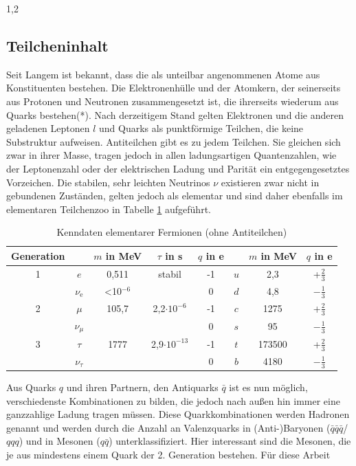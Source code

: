 \documentclass[11pt,a4paper,twoside]{report}
\begin{document}
\begin{spacing}{1,2}
\subsection{Teilcheninhalt}
Seit Langem ist bekannt, dass die als unteilbar angenommenen Atome aus Konstituenten bestehen. Die Elektronenhülle und der Atomkern, der seinerseits aus
Protonen und Neutronen zusammengesetzt ist, die ihrerseits wiederum aus Quarks bestehen(*). Nach derzeitigem Stand gelten Elektronen und die anderen geladenen 
Leptonen $l$ und Quarks als punktförmige
Teilchen, die keine Substruktur aufweisen. Antiteilchen gibt es zu jedem Teilchen. Sie gleichen sich zwar in ihrer Masse, tragen jedoch in allen ladungsartigen Quantenzahlen, wie der Leptonenzahl oder
der elektrischen Ladung und Parität ein entgegengesetztes Vorzeichen. Die stabilen, sehr leichten Neutrinos $\nu$ existieren zwar nicht in gebundenen Zuständen, gelten jedoch als elementar und sind daher 
ebenfalls im elementaren Teilchenzoo \cite{PDG} in Tabelle \ref{tab_particlezoo} aufgeführt.
\begin{table}[H]
\begin{tabular}{c|cccc|ccc} \toprule 
 Generation & & $m$ in MeV & $\tau$ in s & $q$ in e & & $m$ in MeV & $q$ in e\\
 \midrule
  1 & $e$ & 0,511 & stabil & -1 & $u$ & 2,3 & +$\frac23$\\
  &$\nu_\text{e}$& <10$^{-6}$ &  & 0 & $d$ & 4,8 & $-\frac13$\\
  2 & $\mu$ & 105,7 & 2,2$\cdot 10^{-6}$ & -1 & $c$ &1275& +$\frac23$\\
  &$\nu_\mu$ & & & 0 & $s$ &95& $-\frac13$\\
  3& $\tau$ &1777& 2,9$\cdot 10^{-13}$ & -1 & $t$ & 173500 & +$\frac23$\\
  &$\nu_\tau$& & & 0 & $b$ &4180 & $-\frac13$
\\\bottomrule \bottomrule
 \end{tabular}
\caption{Kenndaten elementarer Fermionen (ohne Antiteilchen)}
\label{tab_particlezoo}
\end{table}
\noindent
Aus Quarks $q$ und ihren Partnern, den Antiquarks $\bar q$ ist es nun möglich, verschiedenste Kombinationen zu bilden, die jedoch nach außen hin immer eine
ganzzahlige Ladung tragen müssen. Diese Quarkkombinationen werden Hadronen genannt und werden durch die Anzahl an Valenzquarks in (Anti-)Baryonen ($\bar q\bar q\bar q$/$qqq$) und in 
Mesonen ($q\bar q$) unterklassifiziert. Hier interessant sind die Mesonen, die je aus mindestens einem Quark der 2. Generation bestehen. Für diese Arbeit

\end{spacing}
\end{document}
